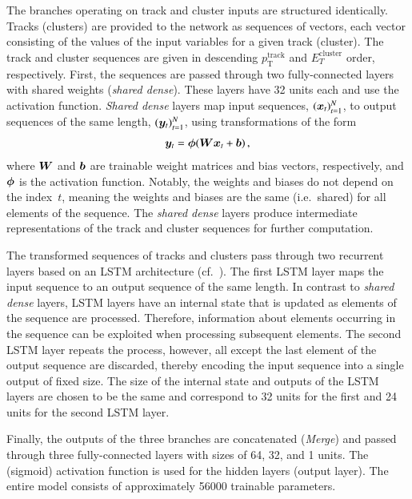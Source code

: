 The branches operating on track and cluster inputs are structured
identically. Tracks (clusters) are provided to the network as sequences of
vectors, each vector consisting of the values of the input variables for a given
track (cluster). The track and cluster sequences are given in descending
$p_{\text{T}}^{\text{track}}$ and $E_{T}^{\text{cluster}}$ order,
respectively. First, the sequences are passed through two fully-connected layers
with shared weights (\emph{shared dense}).  These layers have 32 units each and
use the \ReLU activation function. \emph{Shared dense} layers map input
sequences, $(\bm{x}_t)_{t=1}^{N}$, to output sequences of the same length,
$(\bm{y}_t)_{t=1}^{N}$, using transformations of the form
\begin{align*}
  \bm{y}_t = \bm{\phi}(\bm{W} \bm{x}_t + \bm{b}) \,\text{,}
\end{align*}
where $\bm{W}$ and $\bm{b}$ are trainable weight matrices and bias
vectors, respectively, and $\bm{\phi}$ is the activation function.  Notably,
the weights and biases do not depend on the index~$t$, meaning the weights and
biases are the same (i.e.\ shared) for all elements of the sequence. The
\emph{shared dense} layers produce intermediate representations of the track and
cluster sequences for further computation.

The transformed sequences of tracks and clusters pass through two recurrent
layers based on an LSTM architecture (cf.\ ). The first LSTM layer
maps the input sequence to an output sequence of the same length. In contrast to
\emph{shared dense} layers, LSTM layers have an internal state that is updated
as elements of the sequence are processed. Therefore, information about elements
occurring in the sequence can be exploited when processing subsequent
elements. The second LSTM layer repeats the process, however, all except the
last element of the output sequence are discarded, thereby encoding the input
sequence into a single output of fixed size. The size of the internal state and
outputs of the LSTM layers are chosen to be the same and correspond to 32 units
for the first and 24 units for the second LSTM layer.

Finally, the outputs of the three branches are concatenated
(\emph{Merge}) and passed through three fully-connected layers with
sizes of 64, 32, and 1 units. The \ReLU (sigmoid) activation function
is used for the hidden layers (output layer). The entire model
consists of approximately \num{56000} trainable parameters.


